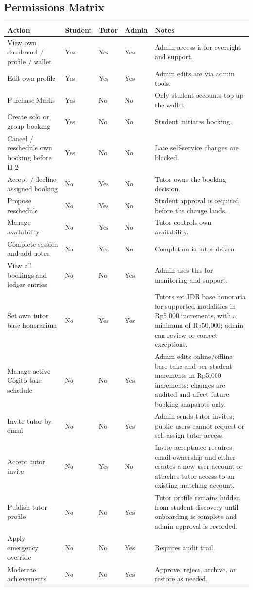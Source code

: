 \documentclass[11pt,a4paper]{article}
\begin{document}
\subsection{Permissions Matrix}

\small
\begin{tabular}{|L{4.7cm}|L{2.2cm}|L{2.2cm}|L{2.2cm}|L{3.0cm}|}
\hline
\textbf{Action} & \textbf{Student} & \textbf{Tutor} & \textbf{Admin} & \textbf{Notes} \\
\hline
View own dashboard / profile / wallet & Yes & Yes & Yes & Admin access is for oversight and support. \\
\hline
Edit own profile & Yes & Yes & Yes & Admin edits are via admin tools. \\
\hline
Purchase Marks & Yes & No & No & Only student accounts top up the wallet. \\
\hline
Create solo or group booking & Yes & No & No & Student initiates booking. \\
\hline
Cancel / reschedule own booking before H-2 & Yes & No & No & Late self-service changes are blocked. \\
\hline
Accept / decline assigned booking & No & Yes & No & Tutor owns the booking decision. \\
\hline
Propose reschedule & No & Yes & No & Student approval is required before the change lands. \\
\hline
Manage availability & No & Yes & No & Tutor controls own availability. \\
\hline
Complete session and add notes & No & Yes & No & Completion is tutor-driven. \\
\hline
View all bookings and ledger entries & No & No & Yes & Admin uses this for monitoring and support. \\
\hline
Set own tutor base honorarium & No & Yes & Yes & Tutors set IDR base honoraria for supported modalities in Rp5,000 increments, with a minimum of Rp50,000; admin can review or correct exceptions. \\
\hline
Manage active Cogito take schedule & No & No & Yes & Admin edits online/offline base take and per-student increments in Rp5,000 increments; changes are audited and affect future booking snapshots only. \\
\hline
Invite tutor by email & No & No & Yes & Admin sends tutor invites; public users cannot request or self-assign tutor access. \\
\hline
Accept tutor invite & No & Yes & No & Invite acceptance requires email ownership and either creates a new user account or attaches tutor access to an existing matching account. \\
\hline
Publish tutor profile & No & No & Yes & Tutor profile remains hidden from student discovery until onboarding is complete and admin approval is recorded. \\
\hline
Apply emergency override & No & No & Yes & Requires audit trail. \\
\hline
Moderate achievements & No & No & Yes & Approve, reject, archive, or restore as needed. \\
\hline
\end{tabular}
\normalsize
\end{document}
